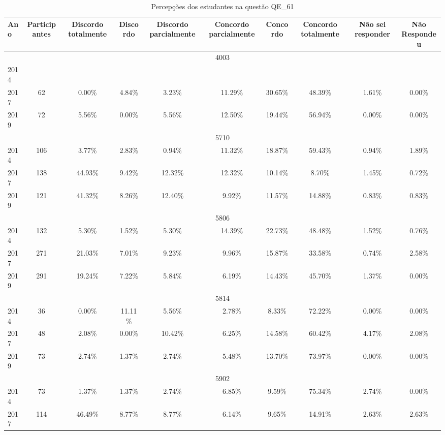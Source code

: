 \begin{table}[H]
\centering
\caption{Percepções dos estudantes na questão QE\_61}
\begin{tabular}{|l|c|ccc|ccc|cc|}
\hline
\toprule
Ano & Participantes & Discordo totalmente & Discordo & Discordo parcialmente & Concordo parcialmente & Concordo & Concordo totalmente & Não sei responder & Não Respondeu \\
\midrule
\hline
\multicolumn{10}{|c|}{4003}\\
\hline
2014 & & & & & & & & & \\
2017 & 62 & 0.00\% & 4.84\% & 3.23\% & 11.29\% & 30.65\% & 48.39\% & 1.61\% & 0.00\%\\
2019 & 72 & 5.56\% & 0.00\% & 5.56\% & 12.50\% & 19.44\% & 56.94\% & 0.00\% & 0.00\%\\
\hline
\hline
\multicolumn{10}{|c|}{5710}\\
\hline
2014 & 106 & 3.77\% & 2.83\% & 0.94\% & 11.32\% & 18.87\% & 59.43\% & 0.94\% & 1.89\%\\
2017 & 138 & 44.93\% & 9.42\% & 12.32\% & 12.32\% & 10.14\% & 8.70\% & 1.45\% & 0.72\%\\
2019 & 121 & 41.32\% & 8.26\% & 12.40\% & 9.92\% & 11.57\% & 14.88\% & 0.83\% & 0.83\%\\
\hline
\hline
\multicolumn{10}{|c|}{5806}\\
\hline
2014 & 132 & 5.30\% & 1.52\% & 5.30\% & 14.39\% & 22.73\% & 48.48\% & 1.52\% & 0.76\%\\
2017 & 271 & 21.03\% & 7.01\% & 9.23\% & 9.96\% & 15.87\% & 33.58\% & 0.74\% & 2.58\%\\
2019 & 291 & 19.24\% & 7.22\% & 5.84\% & 6.19\% & 14.43\% & 45.70\% & 1.37\% & 0.00\%\\
\hline
\hline
\multicolumn{10}{|c|}{5814}\\
\hline
2014 & 36 & 0.00\% & 11.11\% & 5.56\% & 2.78\% & 8.33\% & 72.22\% & 0.00\% & 0.00\%\\
2017 & 48 & 2.08\% & 0.00\% & 10.42\% & 6.25\% & 14.58\% & 60.42\% & 4.17\% & 2.08\%\\
2019 & 73 & 2.74\% & 1.37\% & 2.74\% & 5.48\% & 13.70\% & 73.97\% & 0.00\% & 0.00\%\\
\hline
\hline
\multicolumn{10}{|c|}{5902}\\
\hline
2014 & 73 & 1.37\% & 1.37\% & 2.74\% & 6.85\% & 9.59\% & 75.34\% & 2.74\% & 0.00\%\\
2017 & 114 & 46.49\% & 8.77\% & 8.77\% & 6.14\% & 9.65\% & 14.91\% & 2.63\% & 2.63\%\\

\end{tabular}
\end{table}
